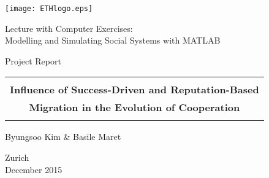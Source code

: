 
\thispagestyle{empty}

\begin{center}
\texttt{[image: ETHlogo.eps]}

\bigskip


\bigskip


\bigskip


\LARGE{ 	Lecture with Computer Exercises:\\ }
\LARGE{ Modelling and Simulating Social Systems with MATLAB\\}

\bigskip

\bigskip

\small{Project Report}\\

\bigskip

\bigskip

\bigskip

\bigskip


\begin{tabular}{|c|}
\hline
\\
\textbf{\LARGE{Influence of Success-Driven and Reputation-Based}}\\
\textbf{\LARGE{Migration in the Evolution of Cooperation}}\\
\\
\hline
\end{tabular}
\bigskip

\bigskip

\bigskip

\LARGE{Byungsoo Kim \& Basile Maret}



\bigskip

\bigskip

\bigskip

\bigskip

\bigskip

\bigskip

\bigskip

\bigskip

Zurich\\
December 2015\\

\end{center}


